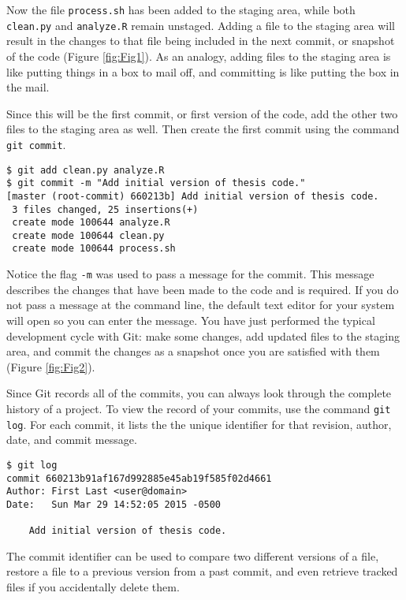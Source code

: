 Now the file \verb|process.sh| has been added to the staging area, while both \verb|clean.py| and \verb|analyze.R| remain unstaged.
Adding a file to the staging area will result in the changes to that file being included in the next commit, or snapshot of the code (Figure \ref{fig:Fig1}).
As an analogy, adding files to the staging area is like putting things in a box to mail off, and committing is like putting the box in the mail.

Since this will be the first commit, or first version of the code, add the other two files to the staging area as well.
Then create the first commit using the command \verb|git commit|.

\begin{lstlisting}
$ git add clean.py analyze.R
$ git commit -m "Add initial version of thesis code."
[master (root-commit) 660213b] Add initial version of thesis code.
 3 files changed, 25 insertions(+)
 create mode 100644 analyze.R
 create mode 100644 clean.py
 create mode 100644 process.sh
\end{lstlisting}

Notice the flag \verb|-m| was used to pass a message for the commit.
This message describes the changes that have been made to the code and is required.
If you do not pass a message at the command line, the default text editor for your system will open so you can enter the message.
You have just performed the typical development cycle with Git:
make some changes, add updated files to the staging area, and commit the changes as a snapshot once you are satisfied with them (Figure \ref{fig:Fig2}).

Since Git records all of the commits, you can always look through the complete history of a project.
To view the record of your commits, use the command \verb|git log|.
For each commit, it lists the the unique identifier for that revision, author, date, and commit message.

\begin{lstlisting}
$ git log
commit 660213b91af167d992885e45ab19f585f02d4661
Author: First Last <user@domain>
Date:   Sun Mar 29 14:52:05 2015 -0500

    Add initial version of thesis code.
\end{lstlisting}

The commit identifier can be used to compare two different versions of a file, restore a file to a previous version from a past commit, and even retrieve tracked files if you accidentally delete them.

